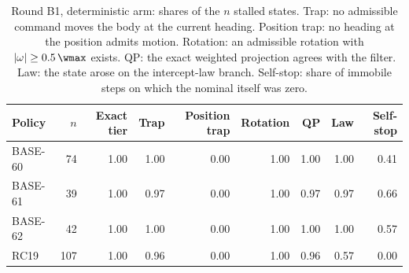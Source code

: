 \begin{table}[t]
\centering\footnotesize
\caption{Round B1, deterministic arm: shares of the $n$ stalled states. Trap: no admissible command moves the body at the current heading. Position trap: no heading at the position admits motion. Rotation: an admissible rotation with $|\omega| \ge 0.5\,\wmax$ exists. QP: the exact weighted projection agrees with the filter. Law: the state arose on the intercept-law branch. Self-stop: share of immobile steps on which the nominal itself was zero.}
\label{tab:b1}
\begin{tabular}{@{}lrrrrrrrr@{}}
\toprule
Policy & $n$ & Exact tier & Trap & Position trap & Rotation & QP & Law & Self-stop \\
\midrule
BASE-60 & 74 & 1.00 & 1.00 & 0.00 & 1.00 & 1.00 & 1.00 & 0.41 \\
BASE-61 & 39 & 1.00 & 0.97 & 0.00 & 1.00 & 0.97 & 0.97 & 0.66 \\
BASE-62 & 42 & 1.00 & 1.00 & 0.00 & 1.00 & 1.00 & 1.00 & 0.57 \\
RC19 & 107 & 1.00 & 0.96 & 0.00 & 1.00 & 0.96 & 0.57 & 0.00 \\
\bottomrule
\end{tabular}
\end{table}
